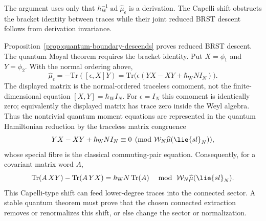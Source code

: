 \documentclass[11pt]{memoir}
\begin{document}
\begin{rmk}
  The argument uses only that
  \(\hbar_{\mathrm{W}}^{-1}\operatorname{ad}\widehat\mu_\epsilon\) is a derivation. The
  Capelli shift obstructs the bracket identity between traces while their
  joint reduced BRST descent follows from derivation invariance.
\end{rmk}

\begin{rmk}\label{rmk:normal-ordering-obstruction}
  Proposition~\ref{prop:quantum-boundary-descends} proves reduced BRST
  descent. The quantum Moyal theorem requires the bracket identity. Put
  $X=\phi_1$ and $Y=\phi_2$. With the normal ordering above,
  $$\widehat\mu_\epsilon=-\mathrm{Tr}([\epsilon,X]Y)
    =\mathrm{Tr}\bigl(\epsilon(YX-XY+\hbar_{\mathrm{W}}N I_N)\bigr).$$
  The displayed matrix is the normal-ordered traceless comoment, not the
  finite-dimensional equation
  \([X,Y]=\hbar_{\mathrm{W}}I_N\).  For \(\epsilon=I_N\) this comoment is
  identically zero; equivalently the displayed matrix has trace zero
  inside the Weyl algebra. Thus the nontrivial quantum moment equations
  are represented in the quantum Hamiltonian reduction by the traceless
  matrix congruence
  $$YX-XY+\hbar_{\mathrm{W}}N I_N\equiv0
    \pmod{\mathcal W_N\widehat\mu(\lie{sl}_N)},$$
  whose special fibre is the classical commuting-pair equation. Consequently, for a covariant
  matrix word $A$,
  $$\mathrm{Tr}(A\,XY)-\mathrm{Tr}(A\,YX)
    =\hbar_{\mathrm{W}}N\,\mathrm{Tr}(A)
    \quad \bmod\ \mathcal W_N\widehat\mu(\lie{sl}_N).$$
  This Capelli-type shift can feed lower-degree traces into the connected
  sector. A stable quantum theorem must prove that the chosen connected
  extraction removes or renormalizes this shift, or else change the sector or
  normalization.
\end{rmk}
\end{document}
